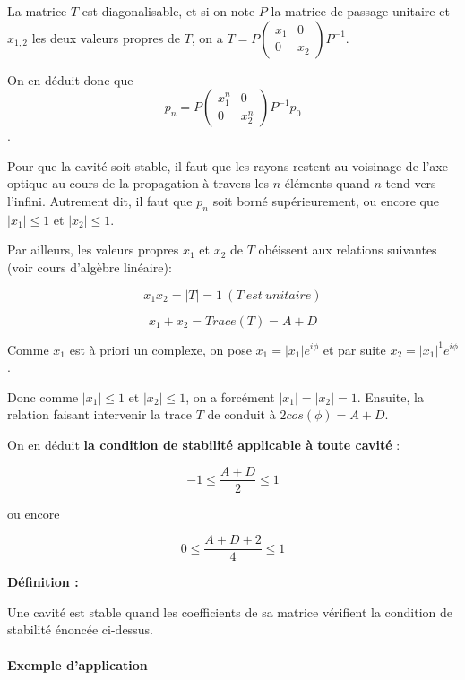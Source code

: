 \documentclass{book}
\begin{document}
La matrice $T$ est diagonalisable, et si on note $P$ la matrice de passage unitaire et $x_{1,2 }$ les deux valeurs propres de $T$, on a $T=P \begin{pmatrix} x_1 & 0 \\ 0 & x_2 \end{pmatrix} P^{-1}$.

On en déduit donc que $$p_n=P \begin{pmatrix} x_1^n & 0 \\ 0 & x_2^n \end{pmatrix} P^{-1}p_0$$.

Pour que la cavité soit stable, il faut que les rayons restent au voisinage de l'axe optique au cours de la propagation à travers les $n$ éléments quand $n$ tend vers l'infini. Autrement dit, il faut que $p_n$ soit borné supérieurement, ou encore que $\lvert {x_1} \rvert \leq 1$ et $\lvert{x_2}\rvert \leq 1$.

Par ailleurs, les valeurs propres $x_1$ et $x_2$ de $T$ obéissent aux relations suivantes (voir cours d'algèbre linéaire):

$$x_1x_2 = \lvert T \rvert = 1\ (T\ est\ unitaire)$$

$$x_1+x_2=Trace(T)=A+D$$

Comme $x_1$ est à priori un complexe, on pose $x_1 = \lvert x_1 \rvert e^{i\phi}$ et par suite $x_2 = \lvert x_1 \rvert ^1 e^{i\phi}$.

Donc comme $\lvert {x_1} \rvert \leq 1$ et $\lvert {x_2} \rvert \leq 1$, on a forcément $\lvert {x_1}
            \rvert = \lvert{x_2}\rvert = 1$. Ensuite, la relation faisant intervenir la trace $T$ de conduit à $2
            cos(\phi)=A+D$. 

On en déduit \textbf{\color{red}la condition de stabilité applicable à toute cavité} :

$$-1\leq
            \frac{A+D} 2 \leq 1$$

ou encore

$$0 \leq \frac {A+D+2} 4 \leq 1$$

\textbf{\color{definition1}Définition :}  
\begin{mdframed}[linecolor=definition1, backgroundcolor=definition2]
Une cavité est stable quand les coefficients de sa matrice vérifient la condition de stabilité énoncée ci-dessus. 
\end{mdframed}

\paragraph{Exemple d'application}
\end{document}
